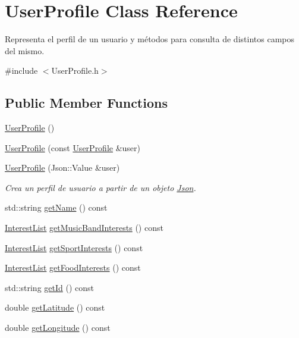 \hypertarget{class_user_profile}{}\section{User\+Profile Class Reference}
\label{class_user_profile}


Representa el perfil de un usuario y métodos para consulta de distintos campos del mismo.  




{\ttfamily \#include $<$User\+Profile.\+h$>$}

\subsection*{Public Member Functions}
\begin{DoxyCompactItemize}
\item 
\hyperlink{class_user_profile_a8c758187bde95bab1d0829007c71e857}{User\+Profile} ()
\item 
\hyperlink{class_user_profile_ab76951c7e88e70c50013705fcfacfbba}{User\+Profile} (const \hyperlink{class_user_profile}{User\+Profile} \&user)
\item 
\hyperlink{class_user_profile_adce414cd8095dd3613d6b0c2ee9d7222}{User\+Profile} (Json\+::\+Value \&user)
\begin{DoxyCompactList}\small\item\em Crea un perfil de usuario a partir de un objeto \hyperlink{namespace_json}{Json}. \end{DoxyCompactList}\item 
std\+::string \hyperlink{class_user_profile_a822835419b623e643362ba3d1eb73651}{get\+Name} () const 
\item 
\hyperlink{_user_profile_8h_a760a9aa8b4a0e703ef8f23404e88b06c}{Interest\+List} \hyperlink{class_user_profile_a883804f04b7aae98d6c609a0bde8c7a3}{get\+Music\+Band\+Interests} () const 
\item 
\hyperlink{_user_profile_8h_a760a9aa8b4a0e703ef8f23404e88b06c}{Interest\+List} \hyperlink{class_user_profile_a502ce9c46cb22ed131f547ab4c1dbcac}{get\+Sport\+Interests} () const 
\item 
\hyperlink{_user_profile_8h_a760a9aa8b4a0e703ef8f23404e88b06c}{Interest\+List} \hyperlink{class_user_profile_a4cc3b5c10b0bb24478f2ceecb7e1c965}{get\+Food\+Interests} () const 
\item 
std\+::string \hyperlink{class_user_profile_ab8957cb38de37ba628a75745c13df4b7}{get\+Id} () const 
\item 
double \hyperlink{class_user_profile_a3663e006f1044dffc943f31861f56550}{get\+Latitude} () const 
\item 
double \hyperlink{class_user_profile_aa804f7c9381824b398b4eff9fa716313}{get\+Longitude} () const 
\end{DoxyCompactItemize}


